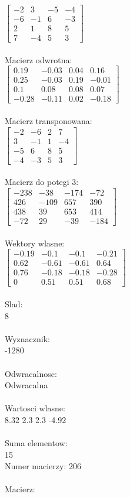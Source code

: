 \documentclass[a4paper,12pt]{article}
\begin{document}
$\begin{bmatrix} -2&3&-5&-4\\-6&-1&6&-3\\2&1&8&5\\7&-4&5&3 \end{bmatrix}$
\\
\\
Macierz odwrotna:\\

$\begin{bmatrix} 0.19&-0.03&0.04&0.16\\0.25&-0.03&0.19&-0.01\\0.1&0.08&0.08&0.07\\-0.28&-0.11&0.02&-0.18 \end{bmatrix}$
\\
\\
Macierz transponowana:\\

$\begin{bmatrix} -2&-6&2&7\\3&-1&1&-4\\-5&6&8&5\\-4&-3&5&3 \end{bmatrix}$
\\
\\
Macierz do potegi 3:\\

$\begin{bmatrix} -238&-38&-174&-72\\426&-109&657&390\\438&39&653&414\\-72&29&-39&-184 \end{bmatrix}$
\\
\\
Wektory wlasne:\\

$\begin{bmatrix} -0.19&-0.1&-0.1&-0.21\\0.62&-0.61&-0.61&0.64\\0.76&-0.18&-0.18&-0.28\\0&0.51&0.51&0.68 \end{bmatrix}$
\\
\\
Slad:\\
8
\\
\\
Wyznacznik:\\
-1280
\\
\\
Odwracalnosc:\\
Odwracalna
\\
\\
Wartosci wlasne:\\
8.32 2.3 2.3 -4.92
\\
\\
Suma elementow:\\
15
\\
\newpage
Numer macierzy:
206
\\
\\
Macierz:\\
\end{document}
